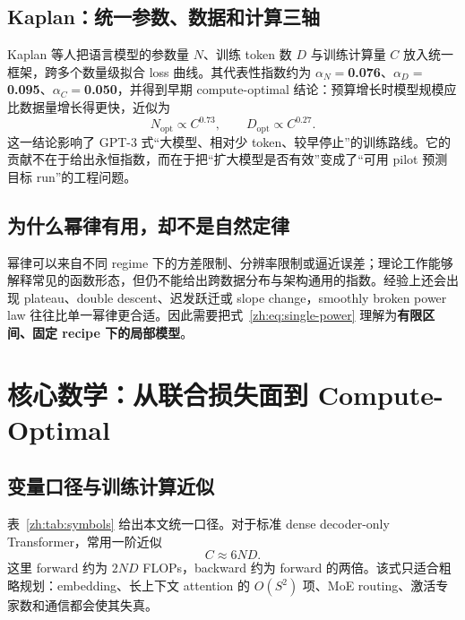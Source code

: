 \documentclass[UTF8,10pt,a4paper,fontset=none]{ctexart}
\newcommand{\term}[1]{\textbf{#1}}
\begin{document}
\subsection{Kaplan：统一参数、数据和计算三轴}

Kaplan 等人把语言模型的参数量 $N$、训练 token 数 $D$ 与训练计算量 $C$ 放入统一框架，跨多个数量级拟合 loss 曲线\cite{zh:kaplan2020}。其代表性指数约为 $\alpha_N=$\textbf{0.076}、$\alpha_D=$\textbf{0.095}、$\alpha_C=$\textbf{0.050}，并得到早期 compute-optimal 结论：预算增长时模型规模应比数据量增长得更快，近似为
\begin{equation}
  N_{\mathrm{opt}}\propto C^{0.73},\qquad
  D_{\mathrm{opt}}\propto C^{0.27}.
  \label{zh:eq:kaplan-opt}
\end{equation}
这一结论影响了 GPT-3 式“大模型、相对少 token、较早停止”的训练路线\cite{zh:brown2020}。它的贡献不在于给出永恒指数，而在于把“扩大模型是否有效”变成了“可用 pilot 预测目标 run”的工程问题。

\subsection{为什么幂律有用，却不是自然定律}

幂律可以来自不同 regime 下的方差限制、分辨率限制或逼近误差；理论工作能够解释常见的函数形态，但仍不能给出跨数据分布与架构通用的指数\cite{zh:bahri2021}。经验上还会出现 plateau、double descent、迟发跃迁或 slope change，smoothly broken power law 往往比单一幂律更合适\cite{zh:caballero2022}。因此需要把式~\eqref{zh:eq:single-power} 理解为\term{有限区间、固定 recipe 下的局部模型}。

\section{核心数学：从联合损失面到 Compute-Optimal}

\subsection{变量口径与训练计算近似}

表~\ref{zh:tab:symbols} 给出本文统一口径。对于标准 dense decoder-only Transformer，常用一阶近似
\begin{equation}
  C\approx 6ND.
  \label{zh:eq:compute}
\end{equation}
这里 forward 约为 $2ND$ FLOPs，backward 约为 forward 的两倍。该式只适合粗略规划：embedding、长上下文 attention 的 $O(S^2)$ 项、MoE routing、激活专家数和通信都会使其失真。
\end{document}
